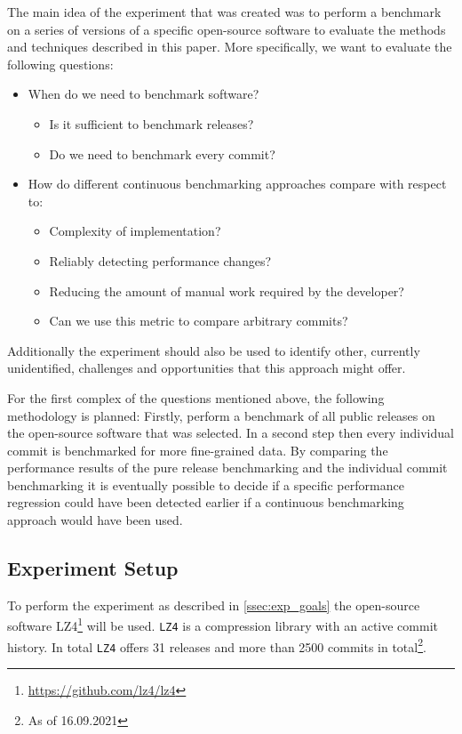 \documentclass[	runningheads,
				a4paper]{llncs}
\begin{document}
	The main idea of the experiment that was created was to perform a benchmark on a series of versions of a specific open-source software to evaluate the methods and techniques described in this paper. More specifically, we want to evaluate the following questions:
	\begin{itemize}
		\item When do we need to benchmark software?
			\begin{itemize}
				\item Is it sufficient to benchmark releases?
				\item Do we need to benchmark every commit?
			\end{itemize}
		\item How do different continuous benchmarking approaches compare with respect to:
			\begin{itemize}
				\item Complexity of implementation?
				\item Reliably detecting performance changes?
				\item Reducing the amount of manual work required by the developer?
				\item Can we use this metric to compare arbitrary commits?
			\end{itemize}
	\end{itemize}

	Additionally the experiment should also be used to identify other, currently unidentified, challenges and opportunities that this approach might offer.

	For the first complex of the questions mentioned above, the following methodology is planned: Firstly, perform a benchmark of all public releases on the open-source software that was selected. In a second step then every individual commit is benchmarked for more fine-grained data. By comparing the performance results of the pure release benchmarking and the individual commit benchmarking it is eventually possible to decide if a specific performance regression could have been detected earlier if a continuous benchmarking approach would have been used.

	\subsection{Experiment Setup}
	\label{ssec:exp_setup}
	
	To perform the experiment as described in \autoref{ssec:exp_goals} the open-source software LZ4\footnote{\url{https://github.com/lz4/lz4}} will be used. \texttt{LZ4} is a compression library with an active commit history. In total \texttt{LZ4} offers 31 releases and more than 2500 commits in total\footnote{As of 16.09.2021}. 
	
\end{document}
